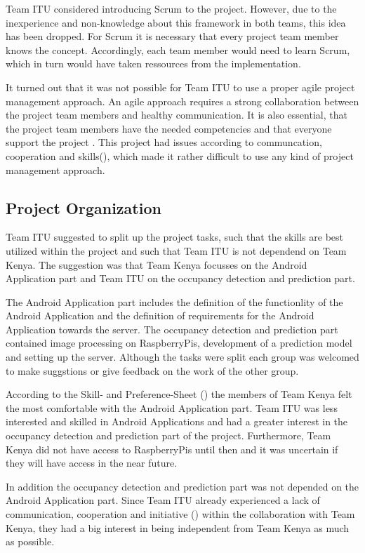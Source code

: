 Team ITU considered introducing Scrum to the project. However, due to the inexperience and non-knowledge about this framework in both teams, this idea has been dropped. For Scrum it is necessary that every project team member knows the concept. Accordingly, each team member would need to learn Scrum, which in turn would have taken ressources from the implementation.

It turned out that it was not possible for Team ITU to use a proper agile project management approach. An agile approach requires a strong collaboration between the project team members and healthy communication. It is also essential, that the project team members have the needed competencies and that everyone support the project . This project had issues according to communcation, cooperation and skills(), which made it rather difficult to use any kind of project management approach.


\subsection{Project Organization}
Team ITU suggested to split up the project tasks, such that the skills are best utilized within the project and such that Team ITU is not dependend on Team Kenya. The suggestion was that Team Kenya focusses on the Android Application part and Team ITU on the occupancy detection and prediction part.

The Android Application part includes the definition of the functionlity of the Android Application and the definition of requirements for the Android Application towards the server. The occupancy detection and prediction part contained image processing on RaspberryPis, development of a prediction model and setting up the server. Although the tasks were split each group was welcomed to make suggstions or give feedback on the work of the other group.

According to the Skill- and Preference-Sheet () the members of Team Kenya felt the most comfortable with the Android Application part. Team ITU was less interested and skilled in Android Applications and had a greater interest in the occupancy detection and prediction part of the project. Furthermore, Team Kenya did not have access to RaspberryPis until then and it was uncertain if they will have access in the near future.

In addition the occupancy detection and prediction part was not depended on the Android Application part. Since Team ITU already experienced a lack of communication, cooperation and initiative () within the collaboration with Team Kenya, they had a big interest in being independent from Team Kenya as much as possible.

